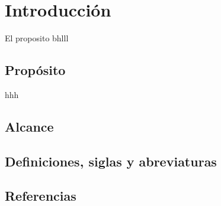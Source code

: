 ﻿\chapter{Introducción}
El proposito
bhlll
\section{Propósito}
hhh
\section{Alcance}

\section{Definiciones, siglas y abreviaturas}

\section{Referencias}